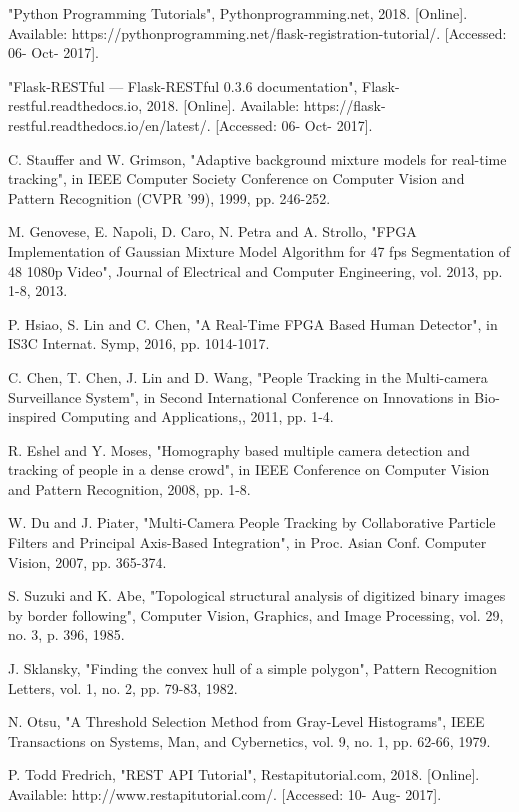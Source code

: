 \documentclass[12pt,a4paper]{report}
\begin{document}
\begin{thebibliography}{10}
"Python Programming Tutorials", Pythonprogramming.net, 2018. [Online]. Available: https://pythonprogramming.net/flask-registration-tutorial/. [Accessed: 06- Oct- 2017].

"Flask-RESTful — Flask-RESTful 0.3.6 documentation", Flask-restful.readthedocs.io, 2018. [Online]. Available: https://flask-restful.readthedocs.io/en/latest/. [Accessed: 06- Oct- 2017].

C. Stauffer and W. Grimson, "Adaptive background mixture models for real-time tracking", in IEEE Computer Society Conference on Computer Vision and Pattern Recognition (CVPR ’99), 1999, pp. 246-252.

M. Genovese, E. Napoli, D. Caro, N. Petra and A. Strollo, "FPGA Implementation of Gaussian Mixture Model Algorithm for 47 fps Segmentation of 48 1080p Video", Journal of Electrical and Computer Engineering, vol. 2013, pp. 1-8, 2013.

P. Hsiao, S. Lin and C. Chen, "A Real-Time FPGA Based Human Detector", in IS3C Internat. Symp, 2016, pp. 1014-1017.

C. Chen, T. Chen, J. Lin and D. Wang, "People Tracking in the Multi-camera Surveillance System", in Second International Conference on Innovations in Bio-inspired Computing and Applications,, 2011, pp. 1-4.

R. Eshel and Y. Moses, "Homography based multiple camera detection and tracking of people in a dense crowd", in IEEE Conference on Computer Vision and Pattern Recognition, 2008, pp. 1-8.

W. Du and J. Piater, "Multi-Camera People Tracking by Collaborative Particle Filters and Principal Axis-Based Integration", in Proc. Asian Conf. Computer Vision, 2007, pp. 365-374.

S. Suzuki and K. Abe, "Topological structural analysis of digitized binary images by border following", Computer Vision, Graphics, and Image Processing, vol. 29, no. 3, p. 396, 1985.

J. Sklansky, "Finding the convex hull of a simple polygon", Pattern Recognition Letters, vol. 1, no. 2, pp. 79-83, 1982.

N. Otsu, "A Threshold Selection Method from Gray-Level Histograms", IEEE Transactions on Systems, Man, and Cybernetics, vol. 9, no. 1, pp. 62-66, 1979.

P. Todd Fredrich, "REST API Tutorial", Restapitutorial.com, 2018. [Online]. Available: http://www.restapitutorial.com/. [Accessed: 10- Aug- 2017].


\end{thebibliography}
\end{document}
